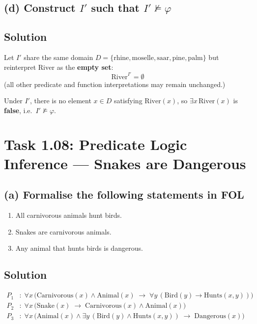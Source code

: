 \documentclass[11pt,a4paper]{article}
\newenvironment{solution}{%
    \begin{tcolorbox}[
        breakable,
        colback=green!4,
        colframe=green!50!black,
        fonttitle=\bfseries,
        title={ Solution},
        left=6pt, right=6pt, top=4pt, bottom=4pt
    ]%
    }{%
    \end{tcolorbox}%
}
\begin{document}
    \subsection*{(d) Construct $I'$ such that $I' \not\models \varphi$}

    \subsection*{Solution}
    \begin{solution}
        Let $I'$ share the same domain $D = \{\text{rhine},\text{moselle},\text{saar},\text{pine},\text{palm}\}$ but reinterpret $\mathrm{River}$ as the \textbf{empty set}:
        \[
            \mathrm{River}^{I'} = \emptyset
        \]
        (all other predicate and function interpretations may remain unchanged.)

        Under $I'$, there is no element $x \in D$ satisfying $\mathrm{River}(x)$, so $\exists x\,\mathrm{River}(x)$ is \textbf{false}, i.e.\ $I' \not\models \varphi$.
    \end{solution}

    \section*{Task 1.08: Predicate Logic Inference — Snakes are Dangerous}

    \subsection*{(a) Formalise the following statements in FOL}

    \begin{enumerate}
        \item All carnivorous animals hunt birds.
        \item Snakes are carnivorous animals.
        \item Any animal that hunts birds is dangerous.
    \end{enumerate}

    \subsection*{Solution}
    \begin{solution}
        \begin{align}
            P_1 &:\; \forall x\,\bigl(\mathrm{Carnivorous}(x) \land \mathrm{Animal}(x)
            \;\to\; \forall y\,(\mathrm{Bird}(y) \to \mathrm{Hunts}(x,y))\bigr) \tag{1}\\[4pt]
            P_2 &:\; \forall x\,\bigl(\mathrm{Snake}(x)
            \;\to\; \mathrm{Carnivorous}(x) \land \mathrm{Animal}(x)\bigr) \tag{2}\\[4pt]
            P_3 &:\; \forall x\,\bigl(\mathrm{Animal}(x) \land \exists y\,(\mathrm{Bird}(y) \land \mathrm{Hunts}(x,y))
            \;\to\; \mathrm{Dangerous}(x)\bigr) \tag{3}
        \end{align}
    \end{solution}
\end{document}

